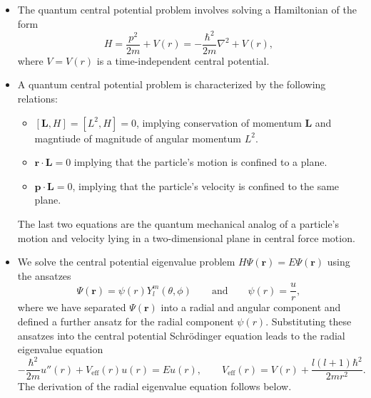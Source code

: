 \documentclass[11pt, a4paper]{article}
\renewcommand{\laplacian}{\nabla^{2}}
\newcommand{\Schro}{Schr\"{o}dinger\xspace}
\newcommand{\Ham}{Hamiltonian\xspace}
\renewcommand{\vec}[1]{\bm{#1}}  %
\renewcommand{\r}{\vec{r}}  %
\renewcommand{\L}{\vec{L}}  %
\newcommand{\p}{\psi}  %
\renewcommand{\P}{\Psi}  %
\begin{document}
\begin{itemize}
	\item The quantum central potential problem involves solving a \Ham of the form
	\begin{equation*}
		H = \frac{p^{2}}{2m} + V(r) = -\frac{\hbar^{2}}{2m} \laplacian + V(r),
	\end{equation*}
    where $ V = V(r) $ is a time-independent central potential.

	\item A quantum central potential problem is characterized by the following relations:
    \begin{itemize}
        \item $ [\L, H] = [L^{2}, H] = 0 $, implying conservation of momentum $ \L $ and magntiude of magnitude of angular momentum $ L^{2} $.

        \item $ \r \cdot \L = 0 $ implying that the particle's motion is confined to a plane.

        \item $ \vec{p} \cdot \L = 0 $, implying that the particle's velocity is confined to the same plane.
    \end{itemize}
	The last two equations are the quantum mechanical analog of a particle's motion and velocity lying in a two-dimensional plane in central force motion.

    \item We solve the central potential eigenvalue problem $ H \Psi(\r) = E \Psi(\r) $ using the ansatzes
	\begin{equation*}
        \P(\r) = \p(r)Y_{l}^{m}(\theta, \phi) \qquad \text{and} \qquad \psi(r) = \frac{u}{r},
	\end{equation*}
    where we have separated $ \P(\r) $ into a radial and angular component and defined a further ansatz for the radial component $ \psi(r) $. Substituting these ansatzes into the central potential \Schro equation leads to the radial eigenvalue equation
    \begin{equation*}
        - \frac{\hbar^{2}}{2m}u''(r) + V_{\text{eff}}(r)u(r) = Eu(r), \qquad V_{\text{eff}}(r) = V(r) + \frac{l (l+1)\hbar^{2}}{2mr^{2}}.
    \end{equation*}
	The derivation of the radial eigenvalue equation follows below.
	
\end{itemize}
\end{document}
